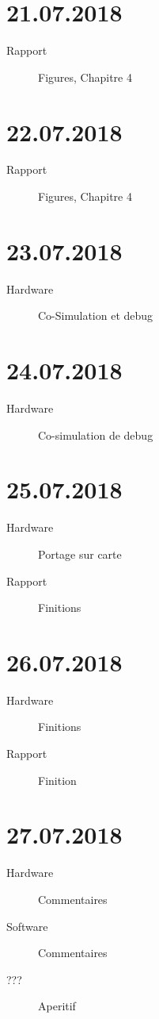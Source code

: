 \section*{21.07.2018}

\begin{description}
	\item [Rapport] Figures, Chapitre 4
\end{description}

\section*{22.07.2018}

\begin{description}
	\item [Rapport] Figures, Chapitre 4
\end{description}

\section*{23.07.2018}

\begin{description}
	\item [Hardware] Co-Simulation et debug
\end{description}

\section*{24.07.2018}

\begin{description}
    \item [Hardware] Co-simulation de debug
	\end{description}

\section*{25.07.2018}

\begin{description}
	\item [Hardware] Portage sur carte
	\item [Rapport] Finitions
\end{description}

\section*{26.07.2018}

\begin{description}
	\item [Hardware] Finitions
	\item [Rapport] Finition
\end{description}

\section*{27.07.2018}

\begin{description}
	\item [Hardware] Commentaires
	\item [Software] Commentaires
	\item [???] Aperitif 
\end{description}

